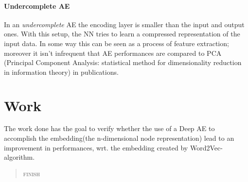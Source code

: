 \documentclass{article}
\begin{document}
			\paragraph{Undercomplete AE}
			In an \textit{undercomplete} AE the encoding layer is smaller than the input and output ones. With this setup, the NN tries to learn a compressed representation of the input data. In some way this can be seen as a process of feature extraction; moreover it isn't infrequent that AE performances are compared to PCA (Principal Component Analysis: statistical method for dimensionality reduction in information theory) in publications.
			\par \noindent \newline
			\begin{figure}[h!]
				\centerline{}
			\end{figure}
			\newpage
			
		\section{Work}
			The work done has the goal to verify whether the use of a Deep AE to accomplish the embedding(the n-dimensional node representation) lead to an improvement in performances, wrt. the embedding created by Word2Vec-algorithm.
			\begin{quote}
				\centering
				\textsc{finish}
			\end{quote}
			
\end{document}
